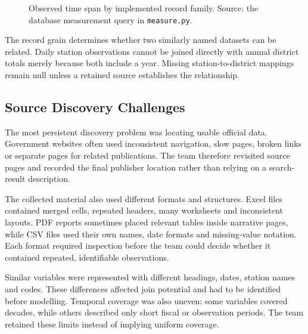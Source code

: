 \begin{figure}[H]
\centering
{}
\caption{Observed time span by implemented record family. Source: the database
measurement query in \texttt{measure.py}.}
\label{fig:timespans}
\end{figure}

The record grain determines whether two similarly named datasets can be related.
Daily station observations cannot be joined directly with annual district
totals merely because both include a year. Missing station-to-district mappings
remain null unless a retained source establishes the relationship.

\subsection{Source Discovery Challenges}
\label{subsec:source-discovery-challenges}

The most persistent discovery problem was locating usable official data.
Government websites often used inconsistent navigation, slow pages, broken
links or separate pages for related publications. The team therefore revisited
source pages and recorded the final publisher location rather than relying on a
search-result description.

The collected material also used different formats and structures. Excel files
contained merged cells, repeated headers, many worksheets and inconsistent
layouts. PDF reports sometimes placed relevant tables inside narrative pages,
while CSV files used their own names, date formats and missing-value notation.
Each format required inspection before the team could decide whether it
contained repeated, identifiable observations.

Similar variables were represented with different headings, dates, station
names and codes. These differences affected join potential and had to be
identified before modelling. Temporal coverage was also uneven: some variables
covered decades, while others described only short fiscal or observation
periods. The team retained these limits instead of implying uniform coverage.


